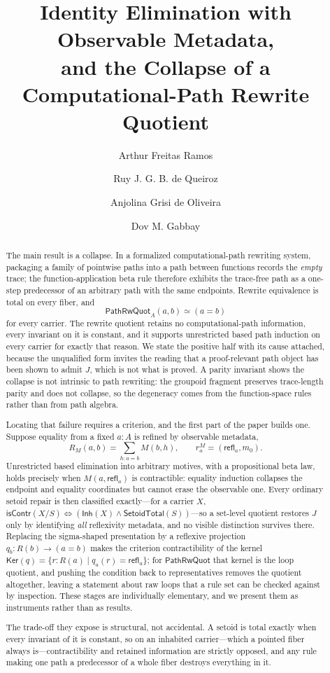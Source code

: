 \documentclass[10pt,reqno]{amsart}
\title[Metadata, Identity Elimination, and a Quotient Collapse]
  {Identity Elimination with Observable Metadata,\\
   and the Collapse of a Computational-Path Rewrite Quotient}
\author{Arthur Freitas Ramos}
\author{Ruy J. G. B. de Queiroz}
\author{Anjolina Grisi de Oliveira}
\author{Dov M. Gabbay}
\newcommand{\isContr}{\mathsf{isContr}}
\newcommand{\refl}{\mathsf{refl}}
\newcommand{\SetTot}{\mathsf{SetoidTotal}}
\newcommand{\Ker}{\mathsf{Ker}}
\newcommand{\PRW}{\mathsf{PathRwQuot}}
\begin{document}
\begin{abstract}
The main result is a collapse.  In a formalized computational-path rewriting
system, packaging a family of pointwise paths into a path between functions
records the \emph{empty} trace; the function-application beta rule therefore
exhibits the trace-free path as a one-step predecessor of an arbitrary path with
the same endpoints.  Rewrite equivalence is total on every fiber, and
\[
 \PRW_A(a,b)\simeq(a=b)
\]
for every carrier.  The rewrite quotient retains no computational-path
information, every invariant on it is constant, and it supports
unrestricted based path induction on every carrier for exactly that reason.  We
state the positive half with its cause attached, because the unqualified form
invites the reading that a proof-relevant path object has been shown to admit
\(J\), which is not what is proved.  A parity invariant shows the collapse is
not intrinsic to path rewriting: the groupoid fragment preserves trace-length
parity and does not collapse, so the degeneracy comes from the function-space
rules rather than from path algebra.

Locating that failure requires a criterion, and the first part of the paper
builds one.  Suppose equality from a fixed \(a:A\) is refined by observable
metadata,
\[
  R_M(a,b)=\sum_{h:a=b}M(b,h),
  \qquad r^M_a=(\refl_a,m_0).
\]
Unrestricted based elimination into arbitrary motives, with a propositional beta
law, holds precisely when \(M(a,\refl_a)\) is contractible: equality induction
collapses the endpoint and equality coordinates but cannot erase the observable
one.  Every ordinary setoid repair is then classified exactly---for a carrier
\(X\), \(\isContr(X/S)\Leftrightarrow(\mathsf{Inh}(X)\wedge\SetTot(S))\)---so a
set-level quotient restores \(J\) only by identifying \emph{all} reflexivity
metadata, and no visible distinction survives there.  Replacing the
sigma-shaped presentation by a reflexive projection \(q_b:R(b)\to(a=b)\) makes
the criterion contractibility of the kernel
\(\Ker(q)=\{r:R(a)\mid q_a(r)=\refl_a\}\); for \(\PRW\) that kernel is the loop
quotient, and pushing the condition back to representatives removes the quotient
altogether, leaving a statement about raw loops that a rule set can be checked
against by inspection.  These stages are individually elementary, and we present
them as instruments rather than as results.

The trade-off they expose is structural, not accidental.  A setoid is total
exactly when every invariant of it is constant, so on an inhabited
carrier---which a pointed fiber always is---contractibility and retained
information are strictly opposed, and any rule making one path a predecessor of
a whole fiber destroys everything in it.


\end{abstract}
\end{document}

